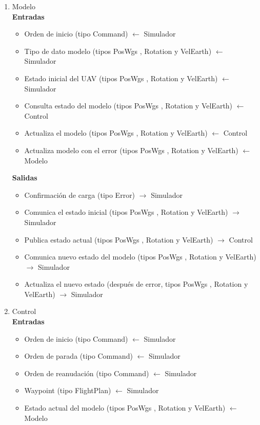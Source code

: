 \documentclass[12pt,a4paper,spanish]{book} %
\begin{document}
\begin{enumerate}
\begin{itemize}
\end{itemize}

\item Modelo
\\
\textbf{Entradas}

\begin{itemize}

\item Orden de inicio (tipo Command) $\leftarrow$ Simulador
\item Tipo de dato modelo (tipos PosWgs , Rotation y VelEarth) $\leftarrow$ Simulador
\item Estado inicial del UAV (tipos PosWgs , Rotation y VelEarth) $\leftarrow$ Simulador
\item Consulta estado del modelo (tipos PosWgs , Rotation y VelEarth) $\leftarrow$ Control
\item Actualiza el modelo (tipos PosWgs , Rotation y VelEarth) $\leftarrow$ Control
\item Actualiza modelo con el error (tipos PosWgs , Rotation y VelEarth) $\leftarrow$ Modelo

\end{itemize}

\textbf{Salidas}

\begin{itemize}

\item Confirmación de carga (tipo Error) $\rightarrow$ Simulador
\item Comunica el estado inicial (tipos PosWgs , Rotation y VelEarth) $\rightarrow$ Simulador
\item Publica estado actual (tipos PosWgs , Rotation y VelEarth) $\rightarrow$ Control
\item Comunica nuevo estado del modelo (tipos PosWgs , Rotation y VelEarth) $\rightarrow$ Simulador
\item Actualiza el nuevo estado (después de error, tipos PosWgs , Rotation y VelEarth) $\rightarrow$ Simulador

\end{itemize}

\item Control
\\
\textbf{Entradas}

\begin{itemize}

\item Orden de inicio (tipo Command) $\leftarrow$ Simulador
\item Orden de parada (tipo Command) $\leftarrow$ Simulador
\item Orden de reanudación (tipo Command) $\leftarrow$ Simulador
\item Waypoint (tipo FlightPlan) $\leftarrow$ Simulador
\item Estado actual del modelo (tipos PosWgs , Rotation y VelEarth) $\leftarrow$ Modelo


\end{itemize}
\end{enumerate}
\end{document}
